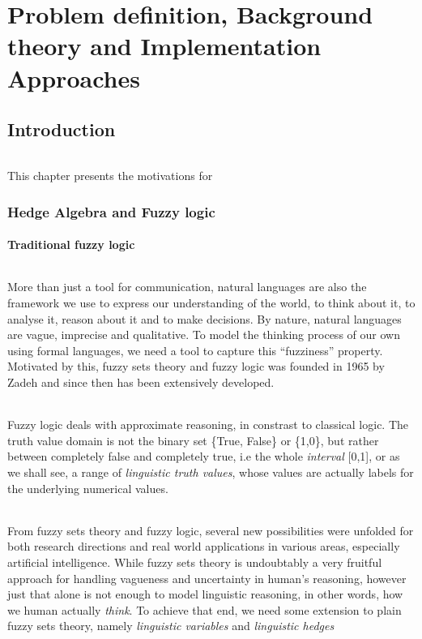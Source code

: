 \documentclass[../gr-final.tex]{subfiles}
\begin{document}
\part{Problem definition, Background theory and Implementation Approaches}
\chapter{Introduction}
\paragraph{} This chapter presents the motivations for 
\section{Hedge Algebra and Fuzzy logic}
\subsection{Traditional fuzzy logic}
\paragraph{} More than just a tool for communication, natural
languages are also the framework we use to express our
understanding of the world, to think about it, to analyse it, reason about it
and to make decisions. By nature, natural languages are
vague, imprecise and qualitative. To model the thinking process
of our own using formal languages, we need a tool to capture this
``fuzziness'' property. Motivated by this, fuzzy sets theory and
fuzzy logic was founded in 1965 by Zadeh and since then has been
extensively developed. 
\paragraph{} Fuzzy logic deals with approximate reasoning, in
constrast to classical logic. The truth value domain is not the
binary set \{True, False\} or \{1,0\}, but rather between completely
false and completely true, i.e the whole {\em interval} [0,1], or
as we shall see, a range of {\em linguistic truth values}, whose
values are actually labels for the underlying numerical values.
\paragraph{} From fuzzy sets theory and fuzzy logic,
several new possibilities were unfolded for both research
directions and real world applications in various areas,
especially artificial intelligence. While fuzzy sets theory is
undoubtably a very fruitful approach for handling vagueness
and uncertainty in human's reasoning, however just that alone is
not enough to model linguistic reasoning, in other words, how we
human actually {\em think}. To achieve that end, we need some
extension to plain fuzzy sets theory, namely {\em linguistic
variables} and {\em linguistic hedges}
\end{document}
